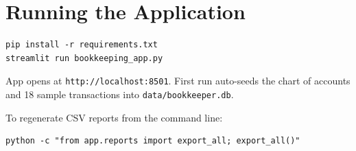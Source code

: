 \documentclass[11pt]{article}
\begin{document}
\appendix
\section{Running the Application}

\begin{lstlisting}
pip install -r requirements.txt
streamlit run bookkeeping_app.py
\end{lstlisting}

App opens at \texttt{http://localhost:8501}. First run auto-seeds the
chart of accounts and 18 sample transactions into
\texttt{data/bookkeeper.db}.

To regenerate CSV reports from the command line:
\begin{lstlisting}
python -c "from app.reports import export_all; export_all()"
\end{lstlisting}
\end{document}
